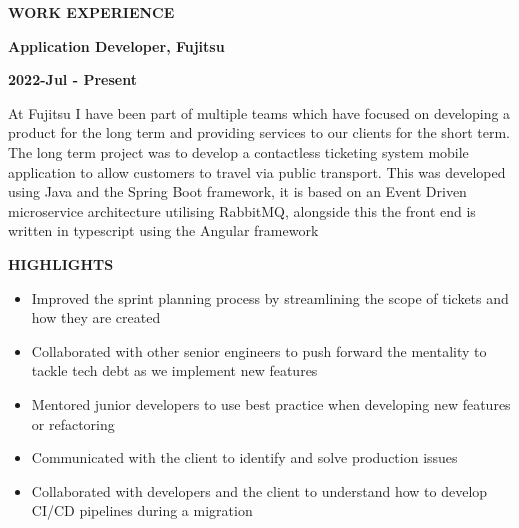 \documentclass[10pt, a4paper]{article}
\begin{document}
    \vspace*{0.5in}
    {\large {} \enspace \textbf{WORK EXPERIENCE}} \par
    {\textbf{Application Developer, Fujitsu}} \par
    {\textbf{2022-Jul - Present}} \par
    At Fujitsu I have been part of multiple teams which have focused on developing a product for the long term and providing services to our clients for the short term. The long term project was to develop a contactless ticketing system mobile application to allow customers to travel via public transport. This was developed using Java and the Spring Boot framework, it is based on an Event Driven microservice architecture utilising RabbitMQ, alongside this the front end is written in typescript using the Angular framework \par
    {\textbf{HIGHLIGHTS}} \par
    \begin{itemize}[label={\large\textbullet}]
      \item Improved the sprint planning process by streamlining the scope of tickets and how they are created
      \item Collaborated with other senior engineers to push forward the mentality to tackle tech debt as we implement new features
      \item Mentored junior developers to use best practice when developing new features or refactoring
      \item Communicated with the client to identify and solve production issues
      \item Collaborated with developers and the client to understand how to develop CI/CD pipelines during a migration
    \end{itemize}
\end{document}
